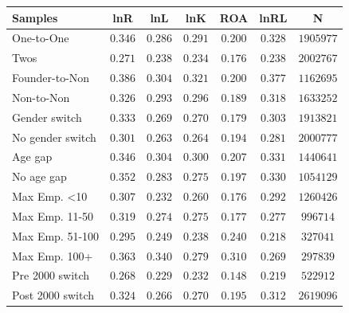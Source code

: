 \begin{tabular}{l*{6}{c}}
\hline\hline
Samples & lnR & lnL & lnK & ROA & lnRL & N \\
\hline
One-to-One & $0.346$ & $0.286$ & $0.291$ & $0.200$ & $0.328$ & $1905977$ \\
Twos & $0.271$ & $0.238$ & $0.234$ & $0.176$ & $0.238$ & $2002767$ \\ \hline
Founder-to-Non & $0.386$ & $0.304$ & $0.321$ & $0.200$ & $0.377$ & $1162695$ \\
Non-to-Non & $0.326$ & $0.293$ & $0.296$ & $0.189$ & $0.318$ & $1633252$ \\ \hline
Gender switch & $0.333$ & $0.269$ & $0.270$ & $0.179$ & $0.303$ & $1913821$ \\
No gender switch & $0.301$ & $0.263$ & $0.264$ & $0.194$ & $0.281$ & $2000777$ \\ \hline
Age gap & $0.346$ & $0.304$ & $0.300$ & $0.207$ & $0.331$ & $1440641$ \\
No age gap & $0.352$ & $0.283$ & $0.275$ & $0.197$ & $0.330$ & $1054129$ \\ \hline
Max Emp. <10 & $0.307$ & $0.232$ & $0.260$ & $0.176$ & $0.292$ & $1260426$ \\
Max Emp. 11-50 & $0.319$ & $0.274$ & $0.275$ & $0.177$ & $0.277$ & $996714$ \\
Max Emp. 51-100 & $0.295$ & $0.249$ & $0.238$ & $0.240$ & $0.218$ & $327041$ \\
Max Emp. 100+ & $0.363$ & $0.340$ & $0.279$ & $0.310$ & $0.269$ & $297839$ \\ \hline
Pre 2000 switch & $0.268$ & $0.229$ & $0.232$ & $0.148$ & $0.219$ & $522912$ \\
Post 2000 switch & $0.324$ & $0.266$ & $0.270$ & $0.195$ & $0.312$ & $2619096$ \\
\hline\hline
\end{tabular}
